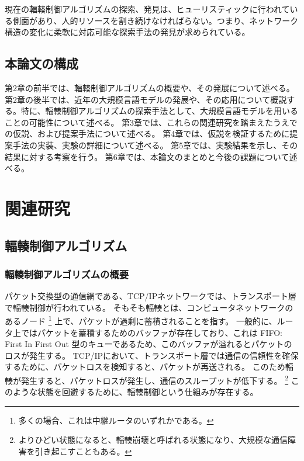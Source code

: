 \documentclass[a4paper,11pt]{jreport}
\begin{document}
現在の輻輳制御アルゴリズムの探索、発見は、ヒューリスティックに行われている側面があり、人的リソースを割き続けなければらない。つまり、ネットワーク構造の変化に柔軟に対応可能な探索手法の発見が求められている。

\newpage

\section{本論文の構成}

第2章の前半では、輻輳制御アルゴリズムの概要や、その発展について述べる。
第2章の後半では、近年の大規模言語モデルの発展や、その応用について概説する。特に、輻輳制御アルゴリズムの探索手法として、大規模言語モデルを用いることの可能性について述べる。
第3章では、これらの関連研究を踏まえたうえでの仮説、および提案手法について述べる。
第4章では、仮説を検証するために提案手法の実装、実験の詳細について述べる。
第5章では、実験結果を示し、その結果に対する考察を行う。
第6章では、本論文のまとめと今後の課題について述べる。

\newpage

\chapter{関連研究}
\section{輻輳制御アルゴリズム}

\subsection{輻輳制御アルゴリズムの概要}

パケット交換型の通信網である、TCP/IPネットワークでは、トランスポート層で輻輳制御が行われている。
そもそも輻輳とは、コンピュータネットワークのあるノード
\footnote{多くの場合、これは中継ルータのいずれかである。}
上で、パケットが過剰に蓄積されることを指す。
一般的に、ルータ上ではパケットを蓄積するためのバッファが存在しており、これは FIFO: First In First Out 型のキューであるため、このバッファが溢れるとパケットのロスが発生する。
TCP/IPにおいて、トランスポート層では通信の信頼性を確保するために、パケットロスを検知すると、パケットが再送される。
このため輻輳が発生すると、パケットロスが発生し、通信のスループットが低下する。
\footnote{よりひどい状態になると、輻輳崩壊と呼ばれる状態になり、大規模な通信障害を引き起こすこともある。}
このような状態を回避するために、輻輳制御という仕組みが存在する。
\end{document}
